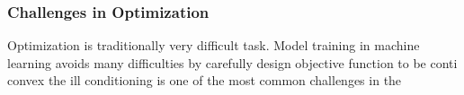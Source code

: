 \subsubsection{Challenges in Optimization}

Optimization is traditionally very difficult task. Model training in machine learning avoids many difficulties by carefully design objective function to be conti convex 
the ill conditioning is one of the most common challenges in the 